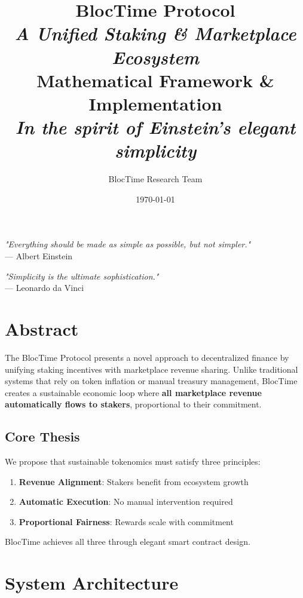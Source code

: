 \documentclass[12pt,a4paper]{article}
\title{\Huge\textbf{\textcolor{primaryblue}{BlocTime Protocol}}\\[0.5cm]
\Large\textit{A Unified Staking \& Marketplace Ecosystem}\\[0.3cm]
\large\textcolor{accentgold}{Mathematical Framework \& Implementation}\\[0.2cm]
\normalsize\textit{In the spirit of Einstein's elegant simplicity}}
\author{BlocTime Research Team}
\date{\today}
\begin{document}
\maketitle
\thispagestyle{empty}

\begin{center}
\vspace{2cm}
\textit{"Everything should be made as simple as possible, but not simpler."}\\
--- Albert Einstein
\vspace{1cm}

\textit{"Simplicity is the ultimate sophistication."}\\
--- Leonardo da Vinci
\end{center}

\newpage
\tableofcontents
\newpage

\section{Abstract}

The BlocTime Protocol presents a novel approach to decentralized finance by unifying staking incentives with marketplace revenue sharing. Unlike traditional systems that rely on token inflation or manual treasury management, BlocTime creates a sustainable economic loop where \textbf{all marketplace revenue automatically flows to stakers}, proportional to their commitment.

\subsection{Core Thesis}

We propose that sustainable tokenomics must satisfy three principles:

\begin{enumerate}
    \item \textbf{Revenue Alignment}: Stakers benefit from ecosystem growth
    \item \textbf{Automatic Execution}: No manual intervention required
    \item \textbf{Proportional Fairness}: Rewards scale with commitment
\end{enumerate}

BlocTime achieves all three through elegant smart contract design.

\section{System Architecture}
\end{document}
